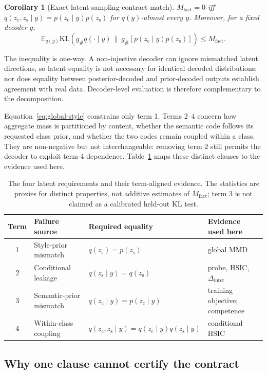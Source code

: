 \documentclass{article}
\newtheorem{corollary}{Corollary}
\newcommand{\zc}{z_{\mathrm{c}}}
\newcommand{\zs}{z_{\mathrm{s}}}
\newcommand{\KL}{\mathrm{KL}}
\newcommand{\Dinter}{\Delta_{\mathrm{inter}}}
\begin{document}
\begin{corollary}[Exact latent sampling-contract match]
\label{cor:valid}
$M_{\mathrm{fact}}=0$ iff
$q(\zc,\zs\mid y)=p(\zc\mid y)p(\zs)$ for $q(y)$-almost every $y$.
Moreover, for a fixed decoder $g$,
\begin{equation}
\mathbb E_{q(y)}\KL\!\left(g_\#q(\cdot\mid y)\,\|\,
g_\#[p(\zc\mid y)p(\zs)]\right)\le M_{\mathrm{fact}}.
\end{equation}
\end{corollary}

The inequality is one-way.  A non-injective decoder can ignore mismatched
latent directions, so latent equality is not necessary for identical decoded
distributions; nor does equality between posterior-decoded and prior-decoded
outputs establish agreement with real data.  Decoder-level evaluation is
therefore complementary to the decomposition.

Equation~\ref{eq:global-style} constrains only term 1.  Terms 2--4 concern how
aggregate mass is partitioned by content, whether the semantic code follows
its requested class prior, and whether the two codes remain coupled within a
class.  They are non-negative but not interchangeable: removing term 2 still
permits the decoder to exploit term-4 dependence.  Table~\ref{tab:audit-map}
maps these distinct clauses to the evidence used here.

\begin{table}[ht]
\caption{The four latent requirements and their term-aligned evidence.  The
statistics are proxies for distinct properties, not additive estimates of
$M_{\mathrm{fact}}$; term 3 is not claimed as a calibrated held-out KL test.}
\label{tab:audit-map}
\centering
\small
\begin{tabular}{clll}
\toprule
Term & Failure source & Required equality & Evidence used here \\
\midrule
1 & Style-prior mismatch & $q(\zs)=p(\zs)$ & global MMD \\
2 & Conditional leakage & $q(\zs\mid y)=q(\zs)$ & probe, HSIC, $\Dinter$ \\
3 & Semantic-prior mismatch & $q(\zc\mid y)=p(\zc\mid y)$ & training objective; competence \\
4 & Within-class coupling & $q(\zc,\zs\mid y)=q(\zc\mid y)q(\zs\mid y)$
& conditional HSIC \\
\bottomrule
\end{tabular}
\end{table}

\subsection{Why one clause cannot certify the contract}
\end{document}
